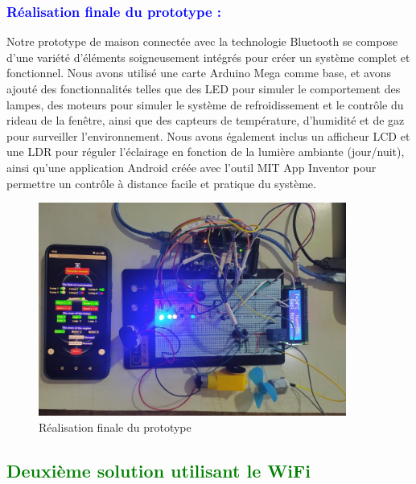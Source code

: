 \begin{flushleft}
	\subsubsection{\textcolor{blue}{Réalisation finale du prototype :} }
	Notre prototype de maison connectée avec la technologie Bluetooth se compose d'une variété d'éléments soigneusement intégrés pour créer un système complet et fonctionnel. Nous avons utilisé une carte Arduino Mega comme base, et avons ajouté des fonctionnalités telles que des LED pour simuler le comportement des lampes, des moteurs pour simuler le système de refroidissement et le contrôle du rideau de la fenêtre, ainsi que des capteurs de température, d'humidité et de gaz pour surveiller l'environnement. Nous avons également inclus un afficheur LCD et une LDR pour réguler l'éclairage en fonction de la lumière ambiante (jour/nuit), ainsi qu'une application Android créée avec l'outil MIT App Inventor pour permettre un contrôle à distance facile et pratique du système.
					\begin{figure}[h]
						\centering
						\includegraphics[width=0.9\textwidth]{chapitres/images/Picture1.jpg}
						\caption{Réalisation finale du prototype}
						\label{fig:labelname}
					\end{figure}
	
	
	\newpage
	\subsection{\textcolor{green}{Deuxième solution utilisant le WiFi}}

\end{flushleft}
